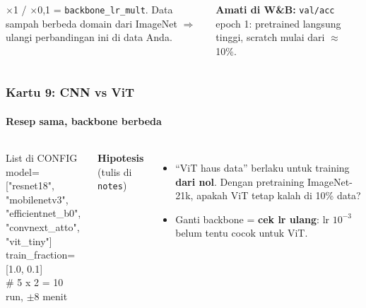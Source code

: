 \documentclass[t,aspectratio=169,xcolor={dvipsnames,table}]{beamer}
\begin{document}
\begin{frame}
\begin{columns}[T]
        \vspace{0.12cm}
        {\scriptsize $\times$1 / $\times$0,1 = \texttt{backbone\_lr\_mult}. Data sampah berbeda domain dari ImageNet $\Rightarrow$ ulangi perbandingan ini di data Anda.}

        \vspace{0.1cm}
        {\scriptsize\color{dlMute} \textbf{Amati di W\&B:} \texttt{val/acc} epoch 1: pretrained langsung tinggi, scratch mulai dari $\approx$10\%.}
    \end{columns}
\end{frame}

\begin{frame}
    \frametitle{Kartu 9: CNN vs ViT}
    \framesubtitle{Resep sama, backbone berbeda}
    \footnotesize

    \begin{columns}[T]
        \begin{block}{List di CONFIG}
            {\ttfamily\scriptsize model=["resnet18", "mobilenetv3",\\\hspace*{3.2em}"efficientnet\_b0",\\\hspace*{3.2em}"convnext\_atto", "vit\_tiny"]\\train\_fraction=[1.0, 0.1]\\\# 5 x 2 = 10 run, $\pm$8 menit}
        \end{block}
        \textbf{Hipotesis} (tulis di \texttt{notes})
        \begin{itemize}
            \item ``ViT haus data'' berlaku untuk training \textbf{dari nol}. Dengan pretraining ImageNet-21k, apakah ViT tetap kalah di 10\% data?
            \item Ganti backbone = \textbf{cek lr ulang}: lr $10^{-3}$ belum tentu cocok untuk ViT.
        \end{itemize}


\end{columns}
\end{frame}
\end{document}
